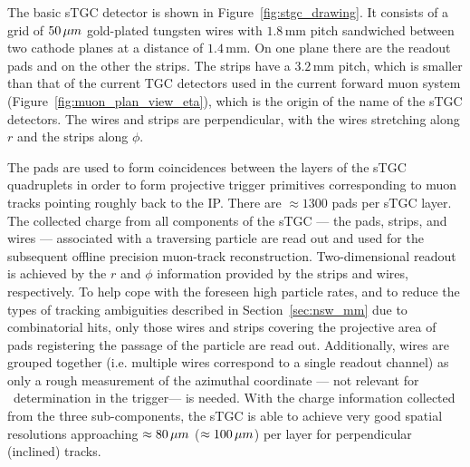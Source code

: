 The basic sTGC detector is shown in Figure~\ref{fig:stgc_drawing}.
It consists of a grid of $50\,\mu m$ gold-plated tungsten wires with $1.8$\,mm pitch
sandwiched between two cathode planes at a distance of $1.4$\,mm.
On one plane there are the readout pads and on the other the strips.
The strips have a $3.2$\,mm pitch, which is smaller than that of the current TGC
detectors used in the current forward muon system (Figure~\ref{fig:muon_plan_view_eta}),
which is the origin of the name of the sTGC detectors.
The wires and strips are perpendicular, with the wires stretching along $r$ and the
strips along $\phi$.

The pads are used to form coincidences between the layers of the sTGC quadruplets in order
to form projective trigger primitives corresponding to muon tracks pointing roughly back to the IP.
There are $\approx 1300$ pads per sTGC layer.
The collected charge from all components of the sTGC --- the pads, strips, and wires --- associated with a traversing particle are read out and
used for the subsequent offline precision muon-track reconstruction.
Two-dimensional readout is achieved by the $r$ and $\phi$ information provided by the strips
and wires, respectively.
To help cope with the foreseen high particle rates, and to reduce the types of tracking ambiguities
described in Section~\ref{sec:nsw_mm} due to combinatorial hits, only
those wires and strips covering the projective area of pads registering the passage of
the particle are read out.
Additionally, wires are grouped together (i.e. multiple wires correspond to a single readout
channel) as only a rough measurement of the azimuthal coordinate --- not relevant for \pT~determination in the trigger---
is needed.
With the charge information collected from the three sub-components, the sTGC is able to achieve very
good spatial resolutions approaching $\approx 80\,\mu m$ ($\approx 100\,\mu m$) per layer for perpendicular (inclined) tracks.

